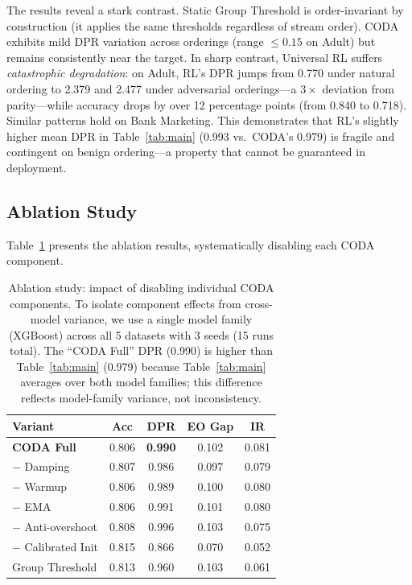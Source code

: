 \documentclass[10pt,twocolumn]{article}
\theoremstyle{definition}
\begin{document}
The results reveal a stark contrast. Static Group Threshold is order-invariant by construction (it applies the same thresholds regardless of stream order). CODA exhibits mild DPR variation across orderings (range $\leq 0.15$ on Adult) but remains consistently near the target. In sharp contrast, Universal RL suffers \emph{catastrophic degradation}: on Adult, RL's DPR jumps from 0.770 under natural ordering to 2.379 and 2.477 under adversarial orderings---a $3\times$ deviation from parity---while accuracy drops by over 12 percentage points (from 0.840 to 0.718). Similar patterns hold on Bank Marketing. This demonstrates that RL's slightly higher mean DPR in Table~\ref{tab:main} (0.993 vs.\ CODA's 0.979) is fragile and contingent on benign ordering---a property that cannot be guaranteed in deployment.

\subsection{Ablation Study}

Table~\ref{tab:ablation} presents the ablation results, systematically disabling each CODA component.

\begin{table}[t]
\centering
\caption{Ablation study: impact of disabling individual CODA components. To isolate component effects from cross-model variance, we use a single model family (XGBoost) across all 5 datasets with 3 seeds (15 runs total). The ``CODA Full'' DPR (0.990) is higher than Table~\ref{tab:main} (0.979) because Table~\ref{tab:main} averages over both model families; this difference reflects model-family variance, not inconsistency.}
\label{tab:ablation}
\small
\begin{tabular}{@{}lcccc@{}}
\toprule
Variant & Acc & DPR & EO Gap & IR \\
\midrule
\textbf{CODA Full} & 0.806 & \textbf{0.990} & 0.102 & 0.081 \\
\quad $-$ Damping & 0.807 & 0.986 & 0.097 & 0.079 \\
\quad $-$ Warmup & 0.806 & 0.989 & 0.100 & 0.080 \\
\quad $-$ EMA & 0.806 & 0.991 & 0.101 & 0.080 \\
\quad $-$ Anti-overshoot & 0.808 & 0.996 & 0.103 & 0.075 \\
\quad $-$ Calibrated Init & 0.815 & 0.866 & 0.070 & 0.052 \\
\midrule
Group Threshold & 0.813 & 0.960 & 0.103 & 0.061 \\
\bottomrule
\end{tabular}
\end{table}
\end{document}
